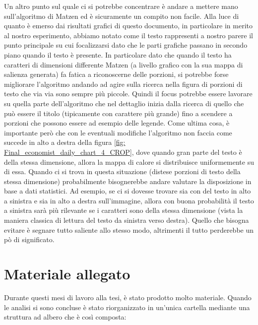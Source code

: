 \documentclass[%
	corpo=12pt,
    twoside,
    stile=classica,
    oldstyle,
    tipotesi=custom,
    greek,
    evenboxes,
]{toptesi}
\begin{document}
{Un altro punto sul quale ci si potrebbe concentrare è andare a mettere mano sull'algoritmo di Matzen ed è sicuramente un compito non  facile. Alla luce di quanto è emerso dai risultati grafici di questo documento, in particolare in merito al nostro esperimento, abbiamo notato come il testo rappresenti a nostro parere il punto principale su cui focalizzarsi dato che le parti grafiche passano in secondo piano quando il testo è presente. In particolare dato che quando il testo ha caratteri di dimensioni differente Matzen (a livello grafico con la sua mappa di salienza generata) fa fatica a riconoscerne delle porzioni, si potrebbe forse migliorare l'algoritmo andando ad agire sulla ricerca nella figura di porzioni di testo che via via sono sempre più piccole. Quindi il focus potrebbe essere lavorare su quella parte dell'algoritmo che nel dettaglio inizia dalla ricerca di quello che può essere il titolo (tipicamente con carattere più grande) fino a scendere a porzioni che possono essere ad esempio delle legende. Come ultima cosa, è importante però che con le eventuali modifiche l'algoritmo non faccia come succede in alto a destra della figura \ref{fig: Final_economist_daily_chart_4_CROP}, dove quando gran parte del testo è della stessa dimensione, allora la mappa di calore si distribuisce uniformemente su di essa. Quando ci si trova in questa situazione (distese porzioni di testo della stessa dimensione) probabilmente bisognerebbe andare valutare la disposizione in base a dati statistici. Ad esempio, se ci si dovesse trovare sia con del testo in alto a sinistra e sia in alto a destra sull'immagine, allora con buona probabilità il testo a sinistra sarà più rilevante se i caratteri sono della stessa dimensione (vista la maniera classica di lettura del testo da sinistra verso destra). Quello che bisogna evitare è segnare tutto saliente allo stesso modo, altrimenti il tutto perderebbe un pò di significato.


\section{Materiale allegato}

Durante questi mesi di lavoro alla tesi, è stato prodotto molto materiale. Quando le analisi si sono concluse è stato riorganizzato in un'unica cartella mediante una struttura ad albero che è così composta:

}
\end{document}
